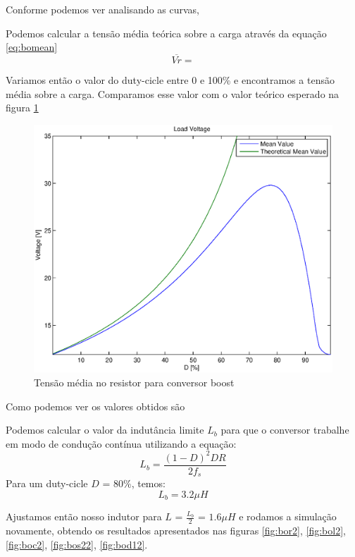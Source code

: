 \documentclass{article}
\begin{document}
Conforme podemos ver analisando as curvas, %

Podemos calcular a tensão média teórica sobre a carga através da equação \ref{eq:bomean}
\begin{equation}
\overline{Vr} = 
\label{eq:bomean}
\end{equation}

Variamos então o valor do duty-cicle entre 0 e 100\% e encontramos a tensão média sobre a carga. Comparamos esse valor com o valor teórico esperado na figura \ref{fig:bovrxd}
\begin{figure}[H]
	\centering
	\includegraphics[width=0.7\linewidth]{matlab/boost/r_vrxd}
	\caption{Tensão média no resistor para conversor boost}
	\label{fig:bovrxd}
\end{figure}

Como podemos ver os valores obtidos são %

Podemos calcular o valor da indutância limite $L_b$ para que o conversor trabalhe em modo de condução contínua utilizando a equação:
\begin{equation}
L_b = \frac{(1 - D)^2 DR}{2f_s}
\end{equation}
Para um duty-cicle $D$ = $80\%$, temos:
\begin{equation}
L_b =  3.2\mu H
\end{equation}

Ajustamos então nosso indutor para $L$ = $\frac{L_b}{2}$ = $1.6 \mu H$ e rodamos a simulação novamente, obtendo os resultados apresentados nas figuras \ref{fig:bor2}, \ref{fig:bol2}, \ref{fig:boc2}, \ref{fig:bos22}, \ref{fig:bod12}.
\end{document}
